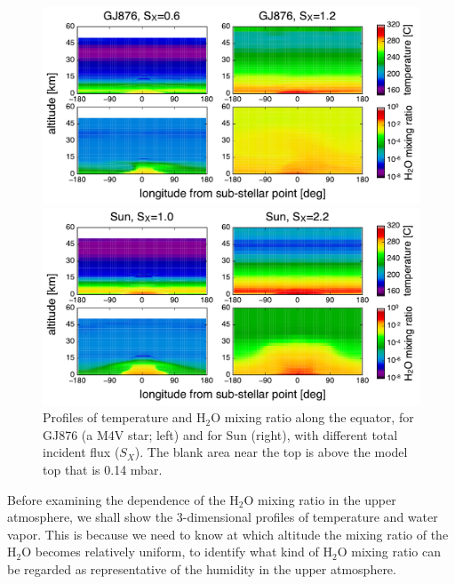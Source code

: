 \documentclass[11pt,numberedappendix,twocolappendix,]{emulateapj}
\def\water{H$_2$O }
\begin{document}
\begin{figure}[!tb]
    \begin{minipage}{0.5\hsize}
\includegraphics[width=\hsize]{fig/AqOH0TLS_GJ876_temp_xH2O.pdf}
    \end{minipage}
    \begin{minipage}{0.5\hsize}
\includegraphics[width=\hsize]{fig/AqOH0TLS_Sun_temp_xH2O.pdf}
    \end{minipage}
    \caption{Profiles of temperature and \water mixing ratio along the equator, for GJ876 (a M4V star; left) and for Sun (right), with different total incident flux ($S_X$). The blank area near the top is above the model top that is  0.14 mbar. }
\label{fig:3Dprofile_equator}
\end{figure}


Before examining the dependence of the \water mixing ratio in the upper atmosphere, we shall show the 3-dimensional profiles of temperature and water vapor. 
This is because we need to know at which altitude the mixing ratio of the \water becomes relatively uniform, to identify what kind of \water mixing ratio can be regarded as representative of the humidity in the upper atmosphere. 
\end{document}
